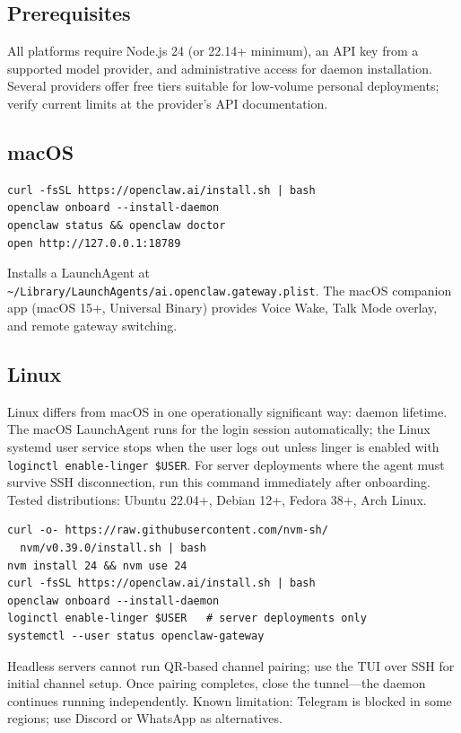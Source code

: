 \documentclass[journal]{IEEEtran}
\begin{document}
\subsection{Prerequisites}

All platforms require Node.js 24 (or 22.14+ minimum), an API key from a
supported model provider, and administrative access for daemon installation.
Several providers offer free tiers suitable for low-volume personal deployments; verify current limits at the provider's API documentation.

\subsection{macOS}

\begin{verbatim}
curl -fsSL https://openclaw.ai/install.sh | bash
openclaw onboard --install-daemon
openclaw status && openclaw doctor
open http://127.0.0.1:18789
\end{verbatim}

Installs a LaunchAgent at
\texttt{\textasciitilde/Library/LaunchAgents/ai.openclaw.gateway.plist}.
The macOS companion app (macOS 15+, Universal Binary) provides Voice Wake,
Talk Mode overlay, and remote gateway switching.

\subsection{Linux}

Linux differs from macOS in one operationally significant way: daemon
lifetime. The macOS LaunchAgent runs for the login session automatically;
the Linux systemd user service stops when the user logs out unless linger
is enabled with \texttt{loginctl enable-linger \$USER}. For server
deployments where the agent must survive SSH disconnection, run this
command immediately after onboarding. Tested distributions: Ubuntu
22.04+, Debian 12+, Fedora 38+, Arch Linux.

\begin{verbatim}
curl -o- https://raw.githubusercontent.com/nvm-sh/
  nvm/v0.39.0/install.sh | bash
nvm install 24 && nvm use 24
curl -fsSL https://openclaw.ai/install.sh | bash
openclaw onboard --install-daemon
loginctl enable-linger $USER   # server deployments only
systemctl --user status openclaw-gateway
\end{verbatim}

Headless servers cannot run QR-based channel pairing; use the TUI over
SSH for initial channel setup. Once pairing completes, close the
tunnel---the daemon continues running independently.
Known limitation: Telegram is blocked in some regions; use Discord or
WhatsApp as alternatives.
\end{document}
